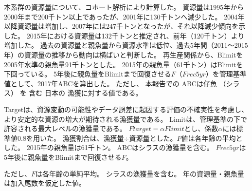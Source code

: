 本系群の資源量について、コホート解析により計算した。
資源量は1995年から2000年まで200千トン以上であったが、2001年に130千トンへ減少した。
2004年以降資源量は増加し、2007年には247千トンとなったが、それ以降減少傾向を示した。
2015年における資源量は132千トンと推定され、前年（120千トン）より増加した。
過去の資源量と親魚量から資源水準は低位、過去5年間（2011～2015年）の資源量の推移から動向は横ばいと判断した。
再生産関係から、Blimitを2005年水準の親魚量91千トンとした。
2015年の親魚量（61千トン）はBlimitを下回っている。
5年後に親魚量をBlimitまで回復させる$F$（$Frec5yr$）を管理基準値として、2017年ABCを算出した。%
ただし、
本報告での
ABCは仔魚
（シラス）
を
含む
日本の
漁獲に対する値である。%


Targetは、資源変動の可能性やデータ誤差に起因する評価の不確実性を考慮し、
より安定的な資源の増大が期待される漁獲量である。
Limitは、管理基準の下で許容される最大レベルの漁獲量である。
$Ftarget = \alpha Flimit$とし、係数$\alpha$には標準値0.8を用いた。
漁獲割合は、漁獲量÷資源量とした。$F$値は各年齢の平均とした。
2015年の親魚量は61千トン。
ABCはシラスの漁獲量を含む。
$Frec5yr$は5年後に親魚量をBlimitまで回復させる$F$。


ただし、$F$は各年齢の単純平均。
シラスの漁獲量を含む。
\thisyrad 年の資源量・親魚量は加入尾数を仮定した値。%
